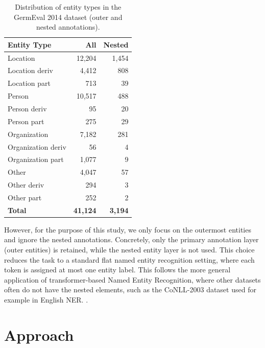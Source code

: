 \documentclass[11pt,a4paper,twocolumn]{article}
\begin{document}
\begin{table}[h]
    \centering
    \begin{tabular}{lrr}
        \toprule
        \textbf{Entity Type} & \textbf{All} & \textbf{Nested} \\
        \midrule
        Location & 12{,}204 & 1{,}454 \\
        Location deriv & 4{,}412 & 808 \\
        Location part & 713 & 39 \\
        \midrule
        Person & 10{,}517 & 488 \\
        Person deriv & 95 & 20 \\
        Person part & 275 & 29 \\
        \midrule
        Organization & 7{,}182 & 281 \\
        Organization deriv & 56 & 4 \\
        Organization part & 1{,}077 & 9 \\
        \midrule
        Other & 4{,}047 & 57 \\
        Other deriv & 294 & 3 \\
        Other part & 252 & 2 \\
        \midrule
        \textbf{Total} & \textbf{41{,}124} & \textbf{3{,}194} \\
        \bottomrule
    \end{tabular}
    \caption{Distribution of entity types in the GermEval 2014 dataset (outer and nested annotations).}
    \label{tab:entity_distribution}
\end{table}

However, for the purpose of this study, we only focus on the outermost entities and ignore the nested annotations. Concretely, only the primary annotation layer (outer entities) is retained, while the nested entity layer is not used. This choice reduces the task to a standard flat named entity recognition setting, where each token is assigned at most one entity label. This follows the more general application of transformer-based Named Entity Recognition, where other datasets often do not have the nested elements, such as the CoNLL-2003 dataset \cite{tjong_kim_sang_introduction_2003} used for example in English NER. \cite{kaur_bert-ner_2024}.

\section{Approach}
\end{document}

